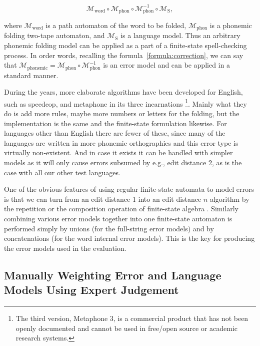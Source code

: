 \documentclass[a4paper,12pt]{article}
\begin{document}
\begin{equation}
    \mathcal{M}_{\mathrm{word}} \circ \mathcal{M}_{\mathrm{phon}} \circ \mathcal{M}_{\mathrm{phon}}^{-1} \circ \mathcal{M}_{\mathrm{S}},
\end{equation}

where $\mathcal{M}_{\mathrm{word}}$ is a path automaton of the word to be
folded, $\mathcal{M}_{\mathrm{phon}}$ is a phonemic folding two-tape automaton,
and $\mathcal{M}_{\mathrm{S}}$ is a language model. Thus an arbitrary phonemic
folding model can be applied as a part of a finite-state spell-checking
process. In order words, recalling the formula~\ref{formula:correction}, we
can say that $\mathcal{M}_{\mathrm{phonemic}} = \mathcal{M}_{\mathrm{phon}}
\circ \mathcal{M}_{\mathrm{phon}}^{-1}$ is an error model and can be applied in
a standard manner.


During the years, more elaborate algorithms have been developed for English,
such as speedcop, and metaphone in its three incarnations
\cite[]{philips1990hanging,philips2000double}\footnote{The third version,
    Metaphone 3, is a commercial product that has not been openly documented
and cannot be used in free/open source or academic research systems.}.  Mainly
what they do is add more rules, maybe more numbers or letters for the folding,
but the implementation is the same and the finite-state formulation likewise.
For languages other than English there are fewer of these, since many of the
languages are written in more phonemic orthographies and this error type is
virtually non-existent. And in case it exists it can be handled with simpler
models as it will only cause errors subsumed by e.g., edit distance 2, as is
the case with all our other test languages.

One of the obvious features of using regular finite-state automata to model
errors is that we can turn from an edit distance 1 into an edit distance $n$
algorithm by the repetition or the composition operation of finite-state
algebra \cite[]{pirinen2012effects}.  Similarly combining various error models
together into one finite-state automaton is performed simply by unions (for the
full-string error models) and by concatenations (for the word internal error
models). This is the key for producing the error models used in the evaluation.

\subsection{Manually Weighting Error and Language Models Using Expert
Judgement}
\label{subsec:manual-weighting}
\end{document}
